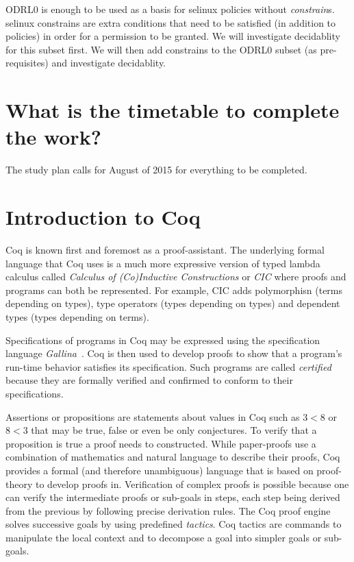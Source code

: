 ODRL0 is enough to be used as a basis for \ac{selinux} policies without \emph{constrain}s. \ac{selinux} constrains are extra  conditions that need to be satisfied (in addition to policies) in order for a permission to be granted. We will investigate decidablity for this subset first. We will then add constrains to the ODRL0 subset (as pre-requisites) and investigate decidablity.



\section{What is the timetable to complete the work?}

The study plan calls for August of 2015 for everything to be completed.


\section{Introduction to Coq}

Coq is known first and foremost as a proof-assistant. The underlying formal language that Coq uses is a much more expressive version of typed lambda calculus called \emph{Calculus of (Co)Inductive Constructions} or \emph{CIC} where proofs and programs can both be represented. For example, CIC adds polymorphisn (terms depending on types), type operators (types depending on types) and dependent types (types depending on terms).

Specifications of programs in Coq may be expressed using the specification language \emph{Gallina}~\cite{gallinaref}. Coq is then used to develop proofs to show that a program's run-time behavior satisfies its specification. Such programs are called \emph{certified} because they are formally verified and confirmed to conform to their specifications.

Assertions or propositions are statements about values in Coq such as $3<8$ or $8<3$ that may be true, false or even be only conjectures. To verify that a proposition is true a proof needs to constructed. While paper-proofs use a combination of mathematics and natural language to describe their proofs, Coq provides a formal (and therefore unambiguous) language that is based on proof-theory to develop proofs in. Verification of complex proofs is possible because one can verify the intermediate proofs or sub-goals in steps, each step being derived from the previous by following precise derivation rules. The Coq proof engine solves successive goals by using predefined \emph{tactics}. Coq tactics are commands to manipulate the local context and to decompose a goal into simpler goals or sub-goals.









